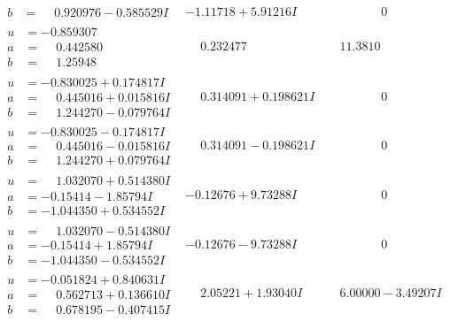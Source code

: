 \documentclass[1p]{elsarticle_modified}
\theoremstyle{definition}
\begin{document}
$$\begin{array}{c|c|c}
\begin{aligned}
b &= \phantom{-}0.920976 - 0.585529 I\end{aligned}
 & -1.11718 + 5.91216 I & \phantom{-0.000000 } 0 \\ \hline\begin{aligned}
u &= -0.859307\phantom{ +0.000000I} \\
a &= \phantom{-}0.442580\phantom{ +0.000000I} \\
b &= \phantom{-}1.25948\phantom{ +0.000000I}\end{aligned}
 & \phantom{-}0.232477\phantom{ +0.000000I} & \phantom{-}11.3810\phantom{ +0.000000I} \\ \hline\begin{aligned}
u &= -0.830025 + 0.174817 I \\
a &= \phantom{-}0.445016 + 0.015816 I \\
b &= \phantom{-}1.244270 - 0.079764 I\end{aligned}
 & \phantom{-}0.314091 + 0.198621 I & \phantom{-0.000000 } 0 \\ \hline\begin{aligned}
u &= -0.830025 - 0.174817 I \\
a &= \phantom{-}0.445016 - 0.015816 I \\
b &= \phantom{-}1.244270 + 0.079764 I\end{aligned}
 & \phantom{-}0.314091 - 0.198621 I & \phantom{-0.000000 } 0 \\ \hline\begin{aligned}
u &= \phantom{-}1.032070 + 0.514380 I \\
a &= -0.15414 - 1.85794 I \\
b &= -1.044350 + 0.534552 I\end{aligned}
 & -0.12676 + 9.73288 I & \phantom{-0.000000 } 0 \\ \hline\begin{aligned}
u &= \phantom{-}1.032070 - 0.514380 I \\
a &= -0.15414 + 1.85794 I \\
b &= -1.044350 - 0.534552 I\end{aligned}
 & -0.12676 - 9.73288 I & \phantom{-0.000000 } 0 \\ \hline\begin{aligned}
u &= -0.051824 + 0.840631 I \\
a &= \phantom{-}0.562713 + 0.136610 I \\
b &= \phantom{-}0.678195 - 0.407415 I\end{aligned}
 & \phantom{-}2.05221 + 1.93040 I & \phantom{-}6.00000 - 3.49207 I \\ \hline\begin{aligned}

\end{aligned}
\end{array}$$
\end{document}
